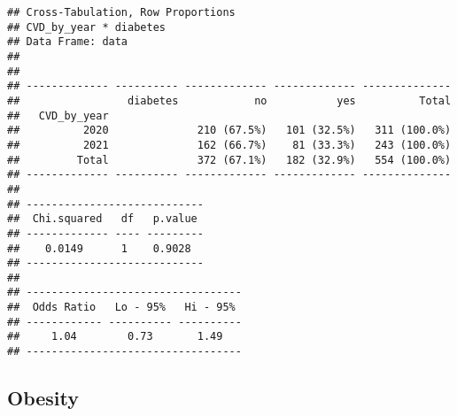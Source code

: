 \documentclass[
]{article}
\newenvironment{Shaded}{\begin{snugshade}}{\end{snugshade}}
\newcommand{\AttributeTok}[1]{\textcolor[rgb]{0.13,0.29,0.53}{#1}}
\newcommand{\ConstantTok}[1]{\textcolor[rgb]{0.56,0.35,0.01}{#1}}
\newcommand{\FunctionTok}[1]{\textcolor[rgb]{0.13,0.29,0.53}{\textbf{#1}}}
\newcommand{\NormalTok}[1]{#1}
\newcommand{\SpecialCharTok}[1]{\textcolor[rgb]{0.81,0.36,0.00}{\textbf{#1}}}
\newcommand{\StringTok}[1]{\textcolor[rgb]{0.31,0.60,0.02}{#1}}
\begin{document}
\begin{Shaded}
\end{Shaded}

\begin{verbatim}
## Cross-Tabulation, Row Proportions  
## CVD_by_year * diabetes  
## Data Frame: data  
## 
## 
## ------------- ---------- ------------- ------------- --------------
##                 diabetes            no           yes          Total
##   CVD_by_year                                                      
##          2020              210 (67.5%)   101 (32.5%)   311 (100.0%)
##          2021              162 (66.7%)    81 (33.3%)   243 (100.0%)
##         Total              372 (67.1%)   182 (32.9%)   554 (100.0%)
## ------------- ---------- ------------- ------------- --------------
## 
## ----------------------------
##  Chi.squared   df   p.value 
## ------------- ---- ---------
##    0.0149      1    0.9028  
## ----------------------------
## 
## ----------------------------------
##  Odds Ratio   Lo - 95%   Hi - 95% 
## ------------ ---------- ----------
##     1.04        0.73       1.49   
## ----------------------------------
\end{verbatim}

\hypertarget{obesity}{%
\subsection{Obesity}\label{obesity}}

\begin{Shaded}
\end{Shaded}
\end{document}
